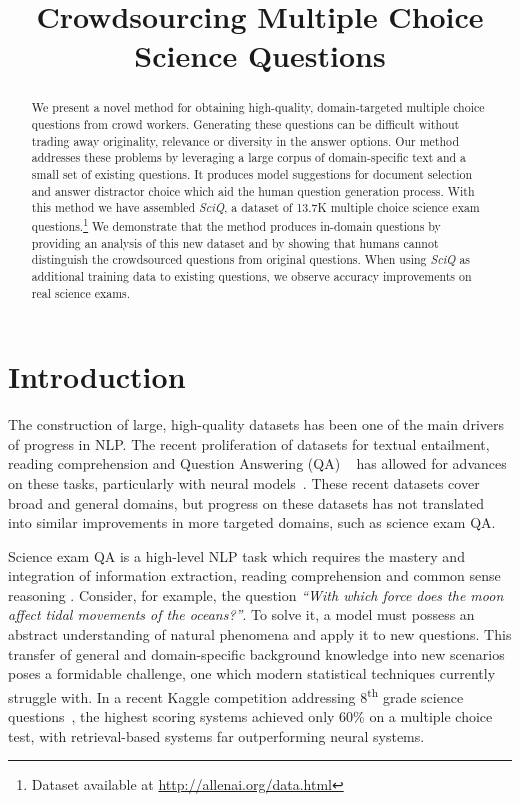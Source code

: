 \title{Crowdsourcing Multiple Choice Science Questions}

\begin{abstract}
We present a novel method for obtaining high-quality, domain-targeted multiple choice questions from crowd workers. Generating these questions can be difficult without trading away originality, relevance or diversity in the  answer options. Our method addresses these problems by leveraging a large corpus of domain-specific text and a small set of existing questions. It produces model suggestions for document selection and answer distractor choice which aid the human question generation process. With this method we have assembled \emph{SciQ}, a dataset of 13.7K multiple choice science exam questions.\footnote{Dataset available at
  \url{http://allenai.org/data.html}
  } We demonstrate that the method produces in-domain questions by providing an analysis of this new dataset and by showing that humans cannot distinguish the crowdsourced questions from original questions. When using \emph{SciQ} as additional training data to existing questions, we observe accuracy improvements on real science exams.
\end{abstract}

\section{Introduction}

The construction of large, high-quality datasets has been one of the main drivers of progress in NLP. The recent proliferation of datasets for textual entailment, reading comprehension and Question Answering (QA) ~\cite{Bowman2015SNLI,
Hermann2015News,rajpurkar2016SQUAD,Hill2015CBT,Hewlett2016WikiReading,Nguyen2016MSMARCO} has allowed for advances on these tasks, particularly with neural models~\cite{Kadlec2016ASRNetwork,Dgingra2016Gated,Sordoni2016Iterative,Seo2016Bidirectional}. These recent datasets cover broad and general domains, but progress on these datasets has not translated into similar improvements in more targeted domains, such as science exam QA.

Science exam QA is a high-level NLP task which requires the mastery and integration of information extraction, reading comprehension and common sense reasoning \cite{Clark2013Study,Clark2015Elementary}. Consider, for example, the question \emph{``With which force does the moon affect tidal movements of the oceans?''}. To solve it, a model must possess an abstract understanding of natural phenomena and apply it to new questions. This transfer of general and domain-specific background knowledge into new scenarios poses a formidable challenge, one which modern statistical techniques currently struggle with.  In a recent Kaggle competition addressing 8\textsuperscript{th} grade science questions~\cite{schoenick2016moving}, the highest scoring systems achieved only 60\% on a multiple choice test, with retrieval-based systems far outperforming neural systems.

